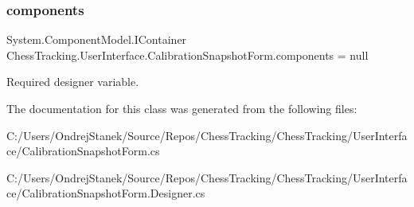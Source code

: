 \subsubsection{\texorpdfstring{components}{components}}
{\footnotesize\ttfamily System.\+Component\+Model.\+I\+Container Chess\+Tracking.\+User\+Interface.\+Calibration\+Snapshot\+Form.\+components = null\hspace{0.3cm}{\ttfamily [private]}}



Required designer variable. 



The documentation for this class was generated from the following files\+:\begin{DoxyCompactItemize}
\item 
C\+:/\+Users/\+Ondrej\+Stanek/\+Source/\+Repos/\+Chess\+Tracking/\+Chess\+Tracking/\+User\+Interface/Calibration\+Snapshot\+Form.\+cs\item 
C\+:/\+Users/\+Ondrej\+Stanek/\+Source/\+Repos/\+Chess\+Tracking/\+Chess\+Tracking/\+User\+Interface/Calibration\+Snapshot\+Form.\+Designer.\+cs\end{DoxyCompactItemize}
